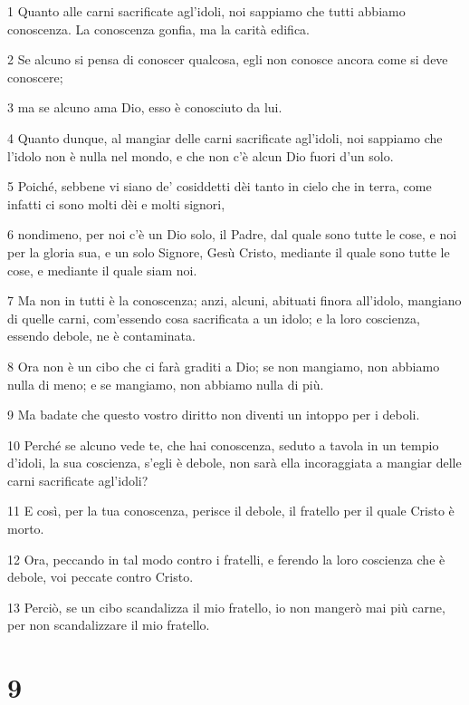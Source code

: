 \par 1 Quanto alle carni sacrificate agl'idoli, noi sappiamo che tutti abbiamo conoscenza. La conoscenza gonfia, ma la carità edifica.
\par 2 Se alcuno si pensa di conoscer qualcosa, egli non conosce ancora come si deve conoscere;
\par 3 ma se alcuno ama Dio, esso è conosciuto da lui.
\par 4 Quanto dunque, al mangiar delle carni sacrificate agl'idoli, noi sappiamo che l'idolo non è nulla nel mondo, e che non c'è alcun Dio fuori d'un solo.
\par 5 Poiché, sebbene vi siano de' cosiddetti dèi tanto in cielo che in terra, come infatti ci sono molti dèi e molti signori,
\par 6 nondimeno, per noi c'è un Dio solo, il Padre, dal quale sono tutte le cose, e noi per la gloria sua, e un solo Signore, Gesù Cristo, mediante il quale sono tutte le cose, e mediante il quale siam noi.
\par 7 Ma non in tutti è la conoscenza; anzi, alcuni, abituati finora all'idolo, mangiano di quelle carni, com'essendo cosa sacrificata a un idolo; e la loro coscienza, essendo debole, ne è contaminata.
\par 8 Ora non è un cibo che ci farà graditi a Dio; se non mangiamo, non abbiamo nulla di meno; e se mangiamo, non abbiamo nulla di più.
\par 9 Ma badate che questo vostro diritto non diventi un intoppo per i deboli.
\par 10 Perché se alcuno vede te, che hai conoscenza, seduto a tavola in un tempio d'idoli, la sua coscienza, s'egli è debole, non sarà ella incoraggiata a mangiar delle carni sacrificate agl'idoli?
\par 11 E così, per la tua conoscenza, perisce il debole, il fratello per il quale Cristo è morto.
\par 12 Ora, peccando in tal modo contro i fratelli, e ferendo la loro coscienza che è debole, voi peccate contro Cristo.
\par 13 Perciò, se un cibo scandalizza il mio fratello, io non mangerò mai più carne, per non scandalizzare il mio fratello.

\chapter{9}

